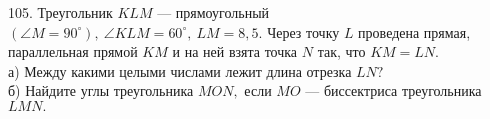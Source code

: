 105. Треугольник $KLM$ --- прямоугольный $(\angle M=90^\circ),\ \angle KLM=60^\circ,\ LM=8,5.$ Через точку $L$ проведена прямая, параллельная прямой $KM$ и на ней взята точка $N$ так, что $KM=LN.$\\
а) Между какими целыми числами лежит длина отрезка $LN?$\\
б) Найдите углы треугольника $MON,$ если $MO$ --- биссектриса треугольника $LMN.$\\
